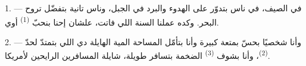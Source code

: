 %
%
%
%
%
%
%

\VUsaut{4.0mm}
\VUsaut{3.0mm}
\VUsaut{3.0mm}

1. --- في الصيف، في ناس بتدوّر على الهدوء والبرد في الجبل، وناس تانية بتفضّل
تروح البحر. وكده عملنا السنة اللي فاتت، علشان إحنا بنحبّ 
\textsuperscript{(1)} أوي.

2. --- وأنا شخصيًا بحسّ بمتعة كبيرة وأنا بتأمّل المساحة المية الهايلة دي اللي
بتمتدّ لحدّ  \textsuperscript{(2)}، وأنا بشوف 
\textsuperscript{(3)} الضخمة بتسافر  طويلة، شايلة المسافرين الرايحين
لأمريكا.

